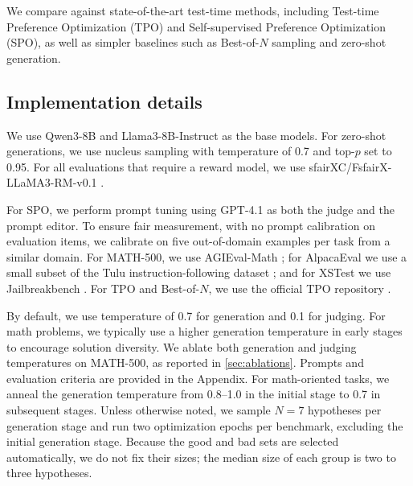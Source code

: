 \documentclass[11pt]{article}
\theoremstyle{plain}
\theoremstyle{definition}
\theoremstyle{remark}
\newcommand{\method}{SAGE}
\begin{document}
We compare against state-of-the-art test-time methods, including Test-time Preference Optimization (TPO) and Self-supervised Preference Optimization (SPO), as well as simpler baselines such as Best-of-\(N\) sampling and zero-shot generation.

\subsection{Implementation details}
We use Qwen3-8B and Llama3-8B-Instruct as the base models. For zero-shot generations, we use nucleus sampling with temperature of 0.7 and top-\(p\) set to 0.95.
For all evaluations that require a reward model, we use sfairXC/FsfairX-LLaMA3-RM-v0.1 \citep{dong2024rlhf}.

For SPO, we perform prompt tuning using GPT-4.1 as both the judge and the prompt editor. To ensure fair measurement, with no prompt calibration on evaluation items, we calibrate on five out-of-domain examples per task from a similar domain.
For MATH-500, we use AGIEval-Math \citep{zhongagieval}; for AlpacaEval we use a small subset of the Tulu instruction-following dataset \citep{lambert2024tulu}; and for XSTest we use Jailbreakbench \citep{chao2024jailbreakbench}. For TPO and Best-of-\(N\), we use the official TPO repository \citep{litest}.

By default, we use temperature of 0.7 for generation and 0.1 for judging. For math problems, we typically use a higher generation temperature in early stages to encourage solution diversity. We ablate both generation and judging temperatures on MATH-500, as reported in \cref{sec:ablations}. Prompts and evaluation criteria are provided in the Appendix.
For math-oriented tasks, we anneal the generation temperature from 0.8--1.0 in the initial stage to 0.7 in subsequent stages. Unless otherwise noted, we sample \(N=7\) hypotheses per generation stage and run two optimization epochs per benchmark, excluding the initial generation stage. Because the good and bad sets are selected automatically, we do not fix their sizes; the median size of each group is two to three hypotheses.

\end{document}
